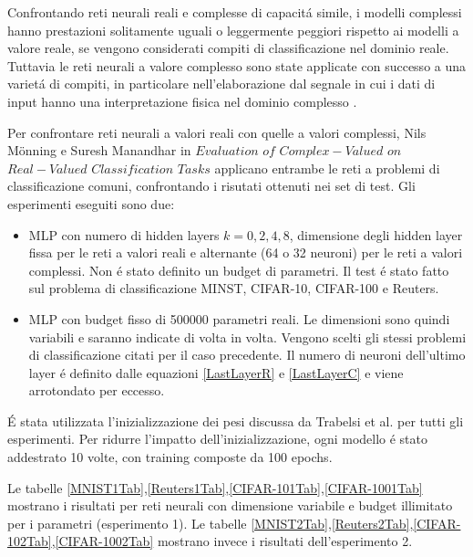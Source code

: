 \documentclass[a4paper,12pt]{report}
\begin{document}
 
 Confrontando reti neurali reali e complesse di capacit\'a simile, i modelli complessi hanno prestazioni solitamente uguali o leggermente peggiori rispetto ai modelli a valore reale, se vengono considerati compiti di classificazione nel dominio reale. 
 Tuttavia le reti neurali a valore complesso sono state applicate con successo a una variet\'a di compiti, in particolare nell'elaborazione dal segnale in cui i dati di input hanno una interpretazione fisica nel dominio complesso\cite{birx1993complex} \cite{sawada2003polar} \cite{yamaki2008singular} \cite{hirose2009complex} \cite{guberman2016complex} \cite{trabelsi2017deep}. 
 
 Per confrontare reti neurali a valori reali con quelle a valori complessi, Nils M\"onning e Suresh Manandhar in $Evaluation$ $of$ $Complex-Valued$ $on$ $Real-Valued$ $Classification$ $Tasks$  \cite{monning2018evaluation} applicano entrambe le reti a problemi di classificazione comuni, confrontando i risutati ottenuti nei set di test. 
 Gli esperimenti eseguiti sono due:
 \begin{itemize}
  \item MLP con numero di hidden layers $k = 0, 2, 4, 8$, dimensione degli hidden layer fissa per le reti a valori reali e alternante (64 o 32 neuroni) per le reti a valori complessi. Non \'e stato definito un budget di parametri. Il test \'e stato fatto sul problema di classificazione MINST, CIFAR-10, CIFAR-100 e Reuters. 
  \item MLP con budget fisso di 500000 parametri reali. Le dimensioni sono quindi variabili e saranno indicate di volta in volta. Vengono scelti gli stessi problemi di classificazione citati per il caso precedente. Il numero di neuroni dell'ultimo layer \'e definito dalle equazioni \ref{LastLayerR} e \ref{LastLayerC} e viene arrotondato per eccesso.
 \end{itemize}
 
 \'E stata utilizzata l'inizializzazione dei pesi discussa da Trabelsi et al. \cite{trabelsi2017deep} per tutti gli esperimenti. 
 Per ridurre l'impatto dell'inizializzazione, ogni modello \'e stato addestrato 10 volte, con training composte da 100 epochs. 
  
 Le tabelle \ref{MNIST1Tab},\ref{Reuters1Tab},\ref{CIFAR-101Tab},\ref{CIFAR-1001Tab} mostrano i risultati per reti neurali con dimensione variabile e budget illimitato per i parametri (esperimento 1). 
 Le tabelle \ref{MNIST2Tab},\ref{Reuters2Tab},\ref{CIFAR-102Tab},\ref{CIFAR-1002Tab} mostrano invece i risultati dell'esperimento 2.
 
\end{document}
